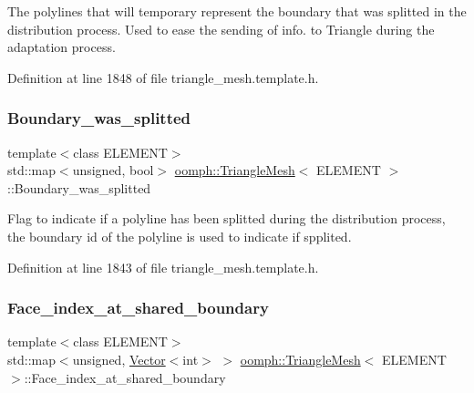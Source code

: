 The polylines that will temporary represent the boundary that was splitted in the distribution process. Used to ease the sending of info. to Triangle during the adaptation process. 



Definition at line 1848 of file triangle\+\_\+mesh.\+template.\+h.

\mbox{\label{classoomph_1_1TriangleMesh_a62fcac1292abe84ba6b739260cdbfef5}} 
\subsubsection{\texorpdfstring{Boundary\+\_\+was\+\_\+splitted}{Boundary\_was\_splitted}}
{\footnotesize\ttfamily template$<$class E\+L\+E\+M\+E\+NT$>$ \\
std\+::map$<$unsigned, bool$>$ \hyperlink{classoomph_1_1TriangleMesh}{oomph\+::\+Triangle\+Mesh}$<$ E\+L\+E\+M\+E\+NT $>$\+::Boundary\+\_\+was\+\_\+splitted\hspace{0.3cm}{\ttfamily [protected]}}



Flag to indicate if a polyline has been splitted during the distribution process, the boundary id of the polyline is used to indicate if spplited. 



Definition at line 1843 of file triangle\+\_\+mesh.\+template.\+h.

\mbox{\label{classoomph_1_1TriangleMesh_a47e462ebe20246557b6e68623942670b}} 
\subsubsection{\texorpdfstring{Face\+\_\+index\+\_\+at\+\_\+shared\+\_\+boundary}{Face\_index\_at\_shared\_boundary}}
{\footnotesize\ttfamily template$<$class E\+L\+E\+M\+E\+NT$>$ \\
std\+::map$<$unsigned, \hyperlink{classoomph_1_1Vector}{Vector}$<$int$>$ $>$ \hyperlink{classoomph_1_1TriangleMesh}{oomph\+::\+Triangle\+Mesh}$<$ E\+L\+E\+M\+E\+NT $>$\+::Face\+\_\+index\+\_\+at\+\_\+shared\+\_\+boundary\hspace{0.3cm}{\ttfamily [protected]}}



